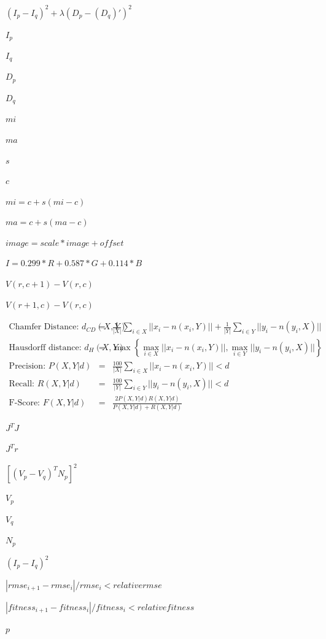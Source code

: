 \documentclass{article}
\begin{document}
$(I_p - I_q)^2 + \lambda(D_p - (D_q)')^2$
\pagebreak

$ I_p $
\pagebreak

$ I_q $
\pagebreak

$ D_p $
\pagebreak

$ D_q $
\pagebreak

$mi$
\pagebreak

$ma$
\pagebreak

$s$
\pagebreak

$c$
\pagebreak

$mi = c + s (mi - c)$
\pagebreak

$ma = c + s (ma - c)$
\pagebreak

$image = scale * image + offset$
\pagebreak

$I = 0.299 * R + 0.587 * G + 0.114 * B$
\pagebreak

$V(r, c+1)-V(r, c)$
\pagebreak

$V(r+1, c)-V(r, c)$
\pagebreak

\begin{eqnarray*} \text{Chamfer Distance: } d_{CD}(X,Y) &=& \frac{1}{|X|}\sum_{i \in X} || x_i - n(x_i, Y) || + \frac{1}{|Y|}\sum_{i \in Y} || y_i - n(y_i, X) || \\{} \text{Hausdorff distance: } d_H(X,Y) &=& \max \left\{ \max_{i \in X} || x_i - n(x_i, Y) ||, \max_{i \in Y} || y_i - n(y_i, X) || \right\} \\{} \text{Precision: } P(X,Y|d) &=& \frac{100}{|X|} \sum_{i \in X} || x_i - n(x_i, Y) || < d \\{} \text{Recall: } R(X,Y|d) &=& \frac{100}{|Y|} \sum_{i \in Y} || y_i - n(y_i, X) || < d \\{} \text{F-Score: } F(X,Y|d) &=& \frac{2 P(X,Y|d) R(X,Y|d)}{P(X,Y|d) + R(X,Y|d)} \end{eqnarray*}
\pagebreak

$J^T J$
\pagebreak

$J^T r$
\pagebreak

$[(V_p - V_q)^T N_p]^2$
\pagebreak

$ V_p $
\pagebreak

$ V_q $
\pagebreak

$ N_p $
\pagebreak

$(I_p - I_q)^2$
\pagebreak

$ |rmse_{i+1} - rmse_i|/rmse_i < relative rmse$
\pagebreak

$ |fitness_{i+1} - fitness_i|/fitness_i < relative fitness$
\pagebreak

$p$
\pagebreak
\end{document}
